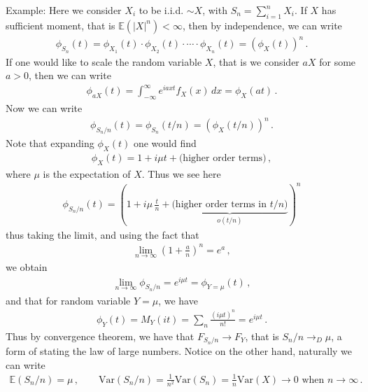 \documentclass[11pt, onesided]{book}
\theoremstyle{break}
\theoremstyle{break}
\newcommand{\example}{\color{green}Example: \color{black}}
\begin{document}
\example Here we consider $X_i$ to be i.i.d. $\sim X$, with $S_n = \sum_{i=1}^n X_i$. If $X$ has sufficient moment, that is $\mathbb{E}(|X|^n) <\infty$, then by independence, we can write
\begin{align*}
\phi_{S_n}(t) = \phi_{X_1}(t) \cdot \phi_{X_2}(t) \cdot \cdots \cdot \phi_{X_n}(t) = (\phi_{X}(t))^n\,.
\end{align*}
If one would like to scale the random variable $X$, that is we consider $aX$ for some $a >0$, then we can write
\begin{align*}
\phi_{aX}(t) = \int_{-\infty}^\infty e^{iaxt}f_X(x) \, dx = \phi_X(at)\,.
\end{align*}
Now we can write
\begin{align*}
\phi_{S_n/n}(t) = \phi_{S_n}(t/n) = \left(\phi_{X}(t/n) \right)^n\,.
\end{align*}
Note that expanding $\phi_X(t)$ one would find
\begin{align*}
\phi_X(t) = 1 + i\mu t + \text{(higher order terms)}\,,
\end{align*}
where $\mu$ is the expectation of $X$. Thus we see here
\begin{align*}
\phi_{S_n/n}(t) = \left(1 + i\mu\,\frac{t}{n} +\underbrace{\text{(higher order terms in $t/n$)}}_{o(t/n)} \right)^n %
\end{align*}
thus taking the limit, and using the fact that
\begin{align*}
\lim_{n\to \infty}\left( 1 + \frac{a}{n}\right)^n = e^a\,,
\end{align*}
we obtain
\begin{align*}
\lim_{n \to \infty} \phi_{S_n/n} = e^{i\mu t}= \phi_{Y =\mu}(t)\,,
\end{align*}
and that for random variable $Y = \mu$, we have
\begin{align*}
\phi_Y(t) = M_Y(it) = \sum_{n} \frac{(i\mu t)^n}{n!} = e^{i\mu t}\,.
\end{align*}
Thus by convergence theorem, we have that $F_{S_n/n}\to F_{Y}$, that is $S_n/n \to_D \mu$, a form of stating the law of large numbers. Notice on the other hand, naturally we can write
\begin{align*}
\mathbb{E}(S_n/n) = \mu \,,\qquad
\text{Var}(S_n/n) = \frac{1}{n^2}\text{Var}(S_n) =\frac{1}{n}\text{Var}(X) \to 0\text{ when }n \to \infty\,.
\end{align*}
\end{document}
